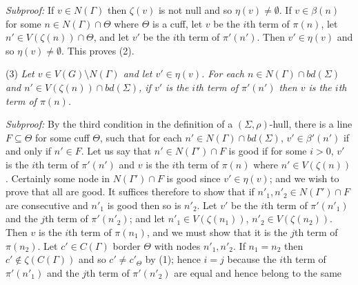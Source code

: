 \textit{Subproof:} If $v \in N(\Gamma)$ then $\zeta(v)$ is not null and so $\eta(v) \ne \emptyset$. If $v \in \beta(n)$ for some $n \in N(\Gamma) \cap \Theta$ where $\Theta$ is a cuff, let $v$ be the $i$th term of $\pi(n)$, let $n' \in V(\zeta(n)) \cap \Theta$, and let $v'$ be the $i$th term of $\pi'(n')$. Then $v' \in \eta(v)$ and so $\eta(v) \ne \emptyset$. This proves (2).

\hspace*{12pt}(3) \textit{Let $v \in V(G) \setminus N(\Gamma)$ and let $v' \in \eta(v)$. For each $n \in N(\Gamma) \cap bd(\Sigma)$ and $n' \in V(\zeta(n)) \cap bd(\Sigma)$, if $v'$ is the $i$th term of $\pi'(n')$ then $v$ is the $i$th term of $\pi(n)$.}

\textit{Subproof:} By the third condition in the definition of a $(\Sigma, \rho)$-hull, there is a line $F \subseteq \Theta$ for some cuff $\Theta$, such that for each $n' \in N(\Gamma) \cap bd(\Sigma)$, $v' \in \beta'(n')$ if and only if $n' \in F$. Let us say that $n' \in N(\Gamma') \cap F$ is good if for some $i > 0$, $v'$ is the $i$th term of $\pi'(n')$ and $v$ is the $i$th term of $\pi(n)$ where $n' \in V(\zeta(n))$. Certainly some node in $N(\Gamma') \cap F$ is good since $v' \in \eta(v)$; and we wish to prove that all are good. It suffices therefore to show that if $n'_1, n'_2 \in N(\Gamma') \cap F$ are consecutive and $n'_1$ is good then so is $n'_2$. Let $v'$ be the $i$th term of $\pi'(n'_1)$ and the $j$th term of $\pi'(n'_2)$; and let $n'_1 \in V(\zeta(n_1))$, $n'_2 \in V(\zeta(n_2))$. Then $v$ is the $i$th term of $\pi(n_1)$, and we must show that it is the $j$th term of $\pi(n_2)$. Let $c' \in C(\Gamma)$ border $\Theta$ with nodes $n'_1, n'_2$. If $n_1 = n_2$ then $c' \notin \zeta(C(\Gamma))$ and so $c' \ne c'_\Theta$ by (1); hence $i = j$ because the $i$th term of $\pi'(n'_1)$ and the $j$th term of $\pi'(n'_2)$ are equal and hence belong to the same
